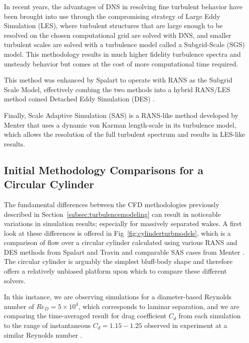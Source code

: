 \documentclass[journal]{new-aiaa}
\begin{document}
In recent years, the advantages of DNS in resolving fine turbulent behavior have been brought into use through the compromising strategy of Large Eddy Simulation (LES), where turbulent structures that are large enough to be resolved on the chosen computational grid are solved with DNS, and smaller turbulent scales are solved with a turbulence model called a Subgrid-Scale (SGS) model. This methodology results in much higher fidelity turbulence spectra and unsteady behavior but comes at the cost of more computational time required.

This method was enhanced by Spalart to operate with RANS as the Subgrid Scale Model, effectively combing the two methods into a hybrid RANS/LES method coined Detached Eddy Simulation (DES) \cite{spalart2009detachededdy}.

Finally, Scale Adaptive Simulation (SAS) is a RANS-like method developed by Menter \cite{menter2005scaleadaptive} that uses a dynamic von Karman length-scale in its turbulence model, which allows the resolution of the full turbulent spectrum and results in LES-like results.











\subsection{Initial Methodology Comparisons for a Circular Cylinder} \label{subsec:initialcompare}

The fundamental differences between the CFD methodologies previously described in Section~\ref{subsec:turbulencemodeling} can result in noticeable variations in simulation results; especially for massively separated wakes. A first look at these differences is offered in Fig~\ref{fig:cylinderturbmodels}, which is a comparison of flow over a circular cylinder calculated using various RANS and DES methods from Spalart and Travin \cite{spalart2009detachededdy} and comparable SAS cases from Menter \cite{menter2005scaleadaptive}. The circular cylinder is arguably the simplest bluff-body shape and therefore offers a relatively unbiased platform upon which to compare these different solvers.

In this instance, we are observing simulations for a diameter-based Reynolds number of $Re_D = 5 \times 10^4$, which corresponds to laminar separation, and we are comparing the time-averaged result for drag coefficient $C_d$ from each simulation to the range of instantaneous $C_d=1.15-1.25$ observed in experiment at a similar Reynolds number \cite{travin2000detachededdy}.
\end{document}
